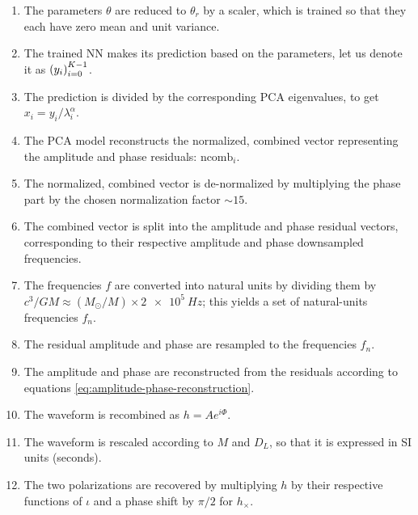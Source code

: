 \documentclass[main.tex]{subfiles}
\begin{document}
\begin{enumerate}
    \item The parameters \(\theta \) are reduced to \(\theta _r\) by a scaler, which is trained so that they each have zero mean and unit variance. 
    \item The trained \ac{NN} makes its prediction based on the parameters, let us denote it as \(\qty(y_i)_{i=0}^{K-1}\).
    \item The prediction is divided by the corresponding \ac{PCA} eigenvalues, to get \(x_i = y_i / \lambda _i^{\alpha }\).
    \item The \ac{PCA} model reconstructs the normalized, combined vector representing the amplitude and phase residuals: \(\text{ncomb}_i\). 
    \item The normalized, combined vector is de-normalized by multiplying the phase part by the chosen normalization factor \(\sim 15\).
    \item The combined vector is split into the amplitude and phase residual vectors, corresponding to their respective amplitude and phase downsampled frequencies.
    \item The frequencies \(f\) are converted into natural units by dividing them by \(c^3 / GM \approx (M_{\odot} / M) \times  \SI{2e5}{Hz}\); this yields a set of natural-units frequencies \(f_n\).
    \item The residual amplitude and phase are resampled to the frequencies \(f_n\).
    \item The amplitude and phase are reconstructed from the residuals according to equations \eqref{eq:amplitude-phase-reconstruction}.
    \item The waveform is recombined as \(h = A e^{i \Phi }\).
    \item The waveform is rescaled according to \(M\) and \(D_L\), so that it is expressed in SI units (seconds).
    \item The two polarizations are recovered by multiplying \(h\) by their respective functions of \(\iota \) and a phase shift by \(\pi /2\) for \(h_ \times \). 
\end{enumerate}


\end{document}
